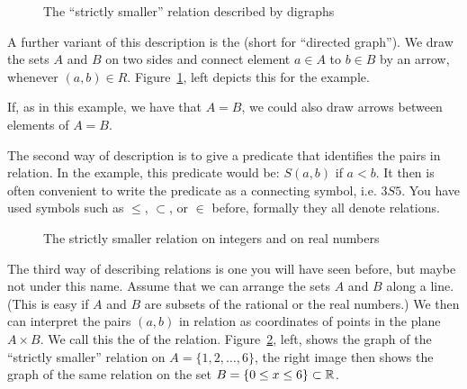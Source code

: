 \begin{figure}[t]
\begin{center}
\qquad
\end{center}
\caption{The ``strictly smaller'' relation described by digraphs}
\label{figRelDigraph}
\end{figure}

A further variant of this description is the  (short for
``directed graph''). We draw the sets $A$ and $B$ on two sides and connect
element $a\in A$ to $b\in B$ by an arrow, whenever $(a,b)\in R$.
Figure~\ref{figRelDigraph}, left depicts this for the example.
\smallskip

If, as in this example, we have that $A=B$, we could also draw arrows between elements
of $A=B$.

\medskip

The second way of description is to give a predicate that
identifies the pairs in relation. In the example, this predicate would be:
$S(a,b)$ if
$a<b$. It then is often convenient to write the predicate as a connecting
symbol, i.e. $3S5$. You have used symbols such as $\le$,
$\subset$, or $\in$ before, formally they all denote relations.
\medskip

\begin{figure}[t]
\begin{center}
\end{center}
\caption{The strictly smaller relation on integers and on real numbers}
\label{figsmaller}
\end{figure}

The third way of describing relations is one you will have seen before, but
maybe not under this name. Assume that we can arrange the sets $A$ and $B$
along a line. (This is easy if $A$ and $B$ are subsets of the rational or
the real numbers.)
We then can interpret the pairs $(a,b)$ in relation as coordinates of points
in the plane $A\times B$.
We call this the  of the
relation. Figure~\ref{figsmaller}, left, shows the graph of the ``strictly
smaller'' relation on $A=\{1,2,\ldots,6\}$, the right image then shows the
graph of the same relation on the set $B=\{0\le x\le 6\}\subset{\mathbb R}$.

